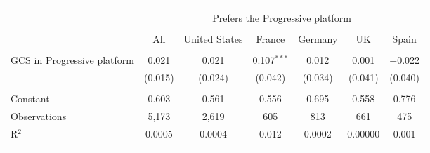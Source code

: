 
\begin{tabular}{@{\extracolsep{5pt}}lcccccc} 
\\[-1.8ex]\hline 
\hline \\[-1.8ex] 
 & \multicolumn{6}{c}{Prefers the Progressive platform} \\ 
\cline{2-7} 
\\[-1.8ex] & All & United States & France & Germany & UK & Spain \\ 
\hline \\[-1.8ex] 
 GCS in Progressive platform & 0.021 & 0.021 & 0.107$^{***}$ & 0.012 & 0.001 & $-$0.022 \\ 
  & (0.015) & (0.024) & (0.042) & (0.034) & (0.041) & (0.040) \\ 
 \hline \\[-1.8ex] 
Constant & 0.603 & 0.561 & 0.556 & 0.695 & 0.558 & 0.776 \\ 
Observations & 5,173 & 2,619 & 605 & 813 & 661 & 475 \\ 
R$^{2}$ & 0.0005 & 0.0004 & 0.012 & 0.0002 & 0.00000 & 0.001 \\ 
\hline 
\hline \\[-1.8ex] 
\end{tabular} 
